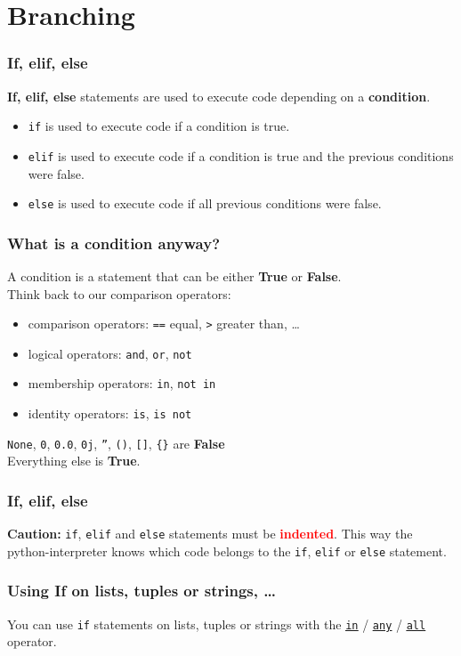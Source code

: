 \documentclass{beamer}
\newcommand{\hrefu}[2]{\underline{\href{#1}{#2}}}
\begin{document}
\section{Branching}
\begin{frame}
  \frametitle{If, elif, else}
  \textbf{If, elif, else} statements are used to execute code depending on a \textbf{condition}.
  \begin{itemize}
    \item \texttt{if} is used to execute code if a condition is true.
    \item \texttt{elif} is used to execute code if a condition is true and the previous conditions were false.
    \item \texttt{else} is used to execute code if all previous conditions were false.
  \end{itemize}
\end{frame}
\begin{frame}
  \frametitle{What is a condition anyway?}
  A condition is a statement that can be either \textbf{True} or \textbf{False}.\\
  \vspace{5mm}
  Think back to our comparison operators: 
  \begin{itemize}
    \item comparison operators: \texttt{==} equal, \texttt{>} greater than, \dots
    \item logical operators: \texttt{and}, \texttt{or}, \texttt{not}
    \item membership operators: \texttt{in}, \texttt{not in}
    \item identity operators: \texttt{is}, \texttt{is not}
  \end{itemize}
  \texttt{None}, \texttt{0}, \texttt{0.0}, \texttt{0j}, \texttt{''}, \texttt{()}, \texttt{[]}, \texttt{\{\}} are \textbf{False}\\Everything else is \textbf{True}.
\end{frame}
\begin{frame}
  \frametitle{If, elif, else}
  \textbf{Caution:} \texttt{if}, \texttt{elif} and \texttt{else} statements must be \textbf{\textcolor{red}{indented}}. This way the python-interpreter knows which code belongs to the \texttt{if}, \texttt{elif} or \texttt{else} statement. 
  
\end{frame}
\begin{frame}

  \frametitle{Using If on lists, tuples or strings, \dots}
  You can use \texttt{if} statements on lists, tuples or strings with the \hrefu{https://www.w3schools.com/python/ref_keyword_in.asp}{\texttt{in}} / \hrefu{https://www.w3schools.com/python/ref_func_any.asp}{\texttt{any}} / \hrefu{https://www.w3schools.com/python/ref_func_all.asp}{\texttt{all}} operator.
  
\end{frame}
\end{document}
